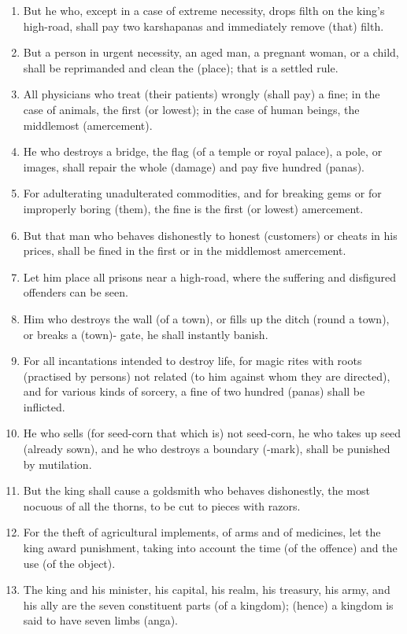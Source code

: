 \begin{enumerate}
\item But he who, except in a case of extreme necessity, drops filth on the king's high-road, shall pay two karshapanas and immediately remove (that) filth.
\item But a person in urgent necessity, an aged man, a pregnant woman, or a child, shall be reprimanded and clean the (place); that is a settled rule.
\item All physicians who treat (their patients) wrongly (shall pay) a fine; in the case of animals, the first (or lowest); in the case of human beings, the middlemost (amercement).
\item He who destroys a bridge, the flag (of a temple or royal palace), a pole, or images, shall repair the whole (damage) and pay five hundred (panas).
\item For adulterating unadulterated commodities, and for breaking gems or for improperly boring (them), the fine is the first (or lowest) amercement.
\item But that man who behaves dishonestly to honest (customers) or cheats in his prices, shall be fined in the first or in the middlemost amercement.
\item Let him place all prisons near a high-road, where the suffering and disfigured offenders can be seen.
\item Him who destroys the wall (of a town), or fills up the ditch (round a town), or breaks a (town)- gate, he shall instantly banish.
\item For all incantations intended to destroy life, for magic rites with roots (practised by persons) not related (to him against whom they are directed), and for various kinds of sorcery, a fine of two hundred (panas) shall be inflicted.
\item He who sells (for seed-corn that which is) not seed-corn, he who takes up seed (already sown), and he who destroys a boundary (-mark), shall be punished by mutilation.
\item But the king shall cause a goldsmith who behaves dishonestly, the most nocuous of all the thorns, to be cut to pieces with razors.
\item For the theft of agricultural implements, of arms and of medicines, let the king award punishment, taking into account the time (of the offence) and the use (of the object).
\item The king and his minister, his capital, his realm, his treasury, his army, and his ally are the seven constituent parts (of a kingdom); (hence) a kingdom is said to have seven limbs (anga).

\end{enumerate}
